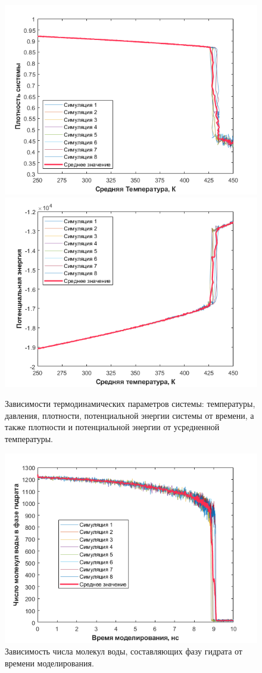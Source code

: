 \begin{figure}[H]
    \begin{minipage}{\linewidth}
        \includegraphics[width=.5\linewidth]{figures/density_temp.png}\hfill
        \includegraphics[width=.5\linewidth]{figures/pe_temp.png}
    \end{minipage}
    \caption{Зависимости термодинамических параметров системы: температуры, давления, плотности, потенциальной энергии системы от времени, а также плотности и потенциальной энергии от усредненной температуры.}
    \label{fig3.13}
\end{figure}

\begin{figure}[H]
    \centering
    \includegraphics{figures/hydr.png}
    \caption{Зависимость числа молекул воды, составляющих фазу гидрата от времени моделирования.}
    \label{fig3.14}
\end{figure}

